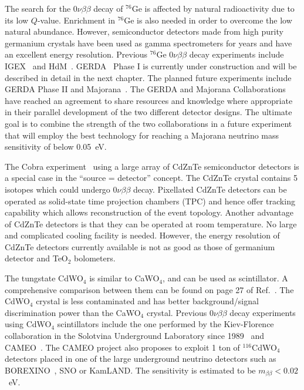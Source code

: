 The search for the $0\nu\beta\beta$ decay of $^{76}$Ge is affected by natural radioactivity due to its low $Q$-value. Enrichment in $^{76}$Ge is also needed in order to overcome the low natural abundance. However, semiconductor detectors made from high purity germanium crystals have been used as gamma spectrometers for years and have an excellent energy resolution. Previous $^{76}$Ge $0\nu\beta\beta$ decay experiments include IGEX~\cite{Aal02} and HdM~\cite{Hei04}. GERDA~\cite{Sch05} Phase I is currently under construction and will be described in detail in the next chapter. The planned future experiments include GERDA Phase II and Majorana~\cite{Gai03, Aal04}. The GERDA and Majorana Collaborations have reached an agreement to share resources and knowledge where appropriate in their parallel development of the two different detector designs. The ultimate goal is to combine the strength of the two collaborations in a future experiment that will employ the best technology for reaching a Majorana neutrino mass sensitivity of below 0.05~eV.

The Cobra experiment~\cite{Zub01, Ell02, Kie03} using a large array of CdZnTe semiconductor detectors is a special case in the ``source = detector'' concept. The CdZnTe crystal contains 5 isotopes which could undergo $0\nu\beta\beta$ decay. Pixellated CdZnTe detectors can be operated as solid-state time projection chambers (TPC) and hence offer tracking capability which allows reconstruction of the event topology. Another advantage of CdZnTe detectors is that they can be operated at room temperature. No large and complicated cooling facility is needed. However, the energy resolution of CdZnTe detectors currently available is not as good as those of germanium detector and TeO$_{2}$ bolometers.

The tungstate CdWO$_{4}$ is similar to CaWO$_{4}$, and can be used as scintillator. A comprehensive comparison between them can be found on page 27 of Ref.~\cite{Avi05}. The CdWO$_{4}$ crystal is less contaminated and has better background/signal discrimination power than the CaWO$_{4}$ crystal. Previous $0\nu\beta\beta$ decay experiments using CdWO$_{4}$ scintillators include the one performed by the Kiev-Florence collaboration in the Solotvina Underground Laboratory since 1989~\cite{Dane00, Dan03} and CAMEO~\cite{Bel00, Bel01}. The CAMEO project also proposes to exploit 1 ton of $^{116}$CdWO$_{4}$ detectors placed in one of the large underground neutrino detectors such as BOREXINO~\cite{Arp08}, SNO or KamLAND. The sensitivity is estimated to be $m_{\beta\beta} < 0.02$~eV.

